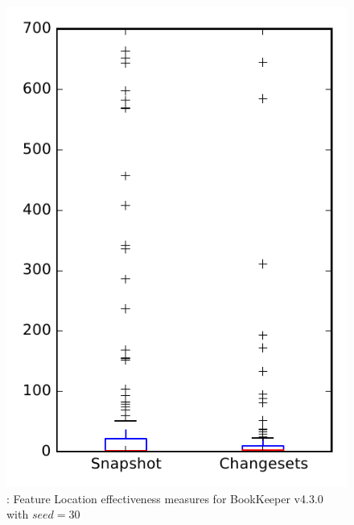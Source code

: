 
\begin{figure}
\centering
\includegraphics[height=0.4\textheight]{figures/flt_seed/rq1_bookkeeper_30}
\caption{\rone: Feature Location effectiveness measures for BookKeeper v4.3.0 with $seed=30$}
\label{fig:flt_seed:rq1:bookkeeper}
\end{figure}
